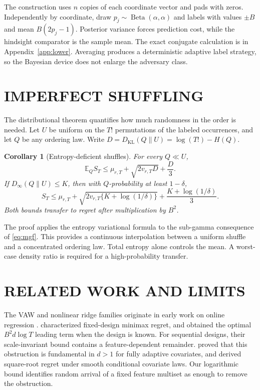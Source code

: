 \documentclass[twoside]{article}
\newtheorem{corollary}[theorem]{Corollary}
\newcommand{\E}{\mathbb E}
\newcommand{\KL}{D_{\mathrm{KL}}}
\begin{document}
The construction uses $n$ copies of each coordinate vector and pads with zeros. Independently by coordinate, draw $p_j\sim\operatorname{Beta}(\alpha,\alpha)$ and labels with values $\pm B$ and mean $B(2p_j-1)$. Posterior variance forces prediction cost, while the hindsight comparator is the sample mean. The exact conjugate calculation is in Appendix~\ref{app:lower}. Averaging produces a deterministic adaptive label strategy, so the Bayesian device does not enlarge the adversary class.

\section{IMPERFECT SHUFFLING}
\label{sec:imperfect}

The distributional theorem quantifies how much randomness in the order is needed. Let $U$ be uniform on the $T!$ permutations of the labeled occurrences, and let $Q$ be any ordering law. Write $D=\KL(Q\|U)=\log(T!)-H(Q)$.

\begin{corollary}[Entropy-deficient shuffles]
\label{cor:entropy}
For every $Q\ll U$,
\begin{equation}
 \E_Q S_T\le\mu_{r,T}+\sqrt{2v_{r,T}D}+\frac D3.
 \label{eq:entropy-mean}
\end{equation}
If $D_\infty(Q\|U)\le K$, then with $Q$-probability at least $1-\delta$,
\begin{equation}
 S_T\le\mu_{r,T}
 +\sqrt{2v_{r,T}\{K+\log(1/\delta)\}}
 +\frac{K+\log(1/\delta)}3.
 \label{eq:entropy-tail}
\end{equation}
Both bounds transfer to regret after multiplication by $B^2$.
\end{corollary}

The proof applies the entropy variational formula to the sub-gamma consequence of \eqref{eq:mgf}. This provides a continuous interpolation between a uniform shuffle and a concentrated ordering law. Total entropy alone controls the mean. A worst-case density ratio is required for a high-probability transfer.

\section{RELATED WORK AND LIMITS}

The VAW and nonlinear ridge families originate in early work on online regression \citep{vovk2001competitive,azoury2001relative}. \citet{bartlett2015minimax} characterized fixed-design minimax regret, and \citet{gaillard2019uniform} obtained the optimal $B^2d\log T$ leading term when the design is known. For sequential designs, their scale-invariant bound contains a feature-dependent remainder. \citet{chen2026self} proved that this obstruction is fundamental in $d>1$ for fully adaptive covariates, and derived square-root regret under smooth conditional covariate laws. Our logarithmic bound identifies random arrival of a fixed feature multiset as enough to remove the obstruction.
\end{document}
